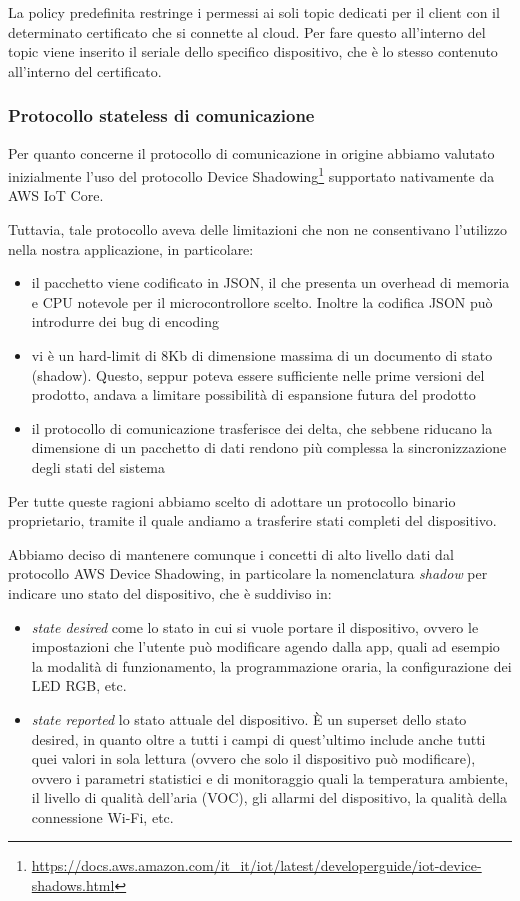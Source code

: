 \documentclass[12pt,a4paper,twoside,titlepage]{book}
\begin{document}
La policy predefinita restringe i permessi ai soli topic dedicati per il client con il determinato certificato 
che si connette al cloud. Per fare questo all'interno del topic viene inserito il seriale dello specifico 
dispositivo, che è lo stesso contenuto all'interno del certificato. 

\subsubsection{Protocollo stateless di comunicazione}

Per quanto concerne il protocollo di comunicazione in origine abbiamo valutato inizialmente 
l'uso del protocollo Device Shadowing\footnote{\url{https://docs.aws.amazon.com/it\_it/iot/latest/developerguide/iot-device-shadows.html}} 
supportato nativamente da AWS IoT Core. 

Tuttavia, tale protocollo aveva delle limitazioni che non ne consentivano l'utilizzo nella nostra
applicazione, in particolare:

\begin{itemize}
    \item il pacchetto viene codificato in JSON, il che presenta un overhead di memoria
        e CPU notevole per il microcontrollore scelto. Inoltre la codifica JSON può
        introdurre dei bug di encoding
    \item vi è un hard-limit di 8Kb di dimensione massima di un documento di stato (shadow).
        Questo, seppur poteva essere sufficiente nelle prime versioni del prodotto, andava
        a limitare possibilità di espansione futura del prodotto
    \item il protocollo di comunicazione trasferisce dei delta, che sebbene riducano la
        dimensione di un pacchetto di dati rendono più complessa la sincronizzazione degli
        stati del sistema
\end{itemize}

Per tutte queste ragioni abbiamo scelto di adottare un protocollo binario proprietario,
tramite il quale andiamo a trasferire stati completi del dispositivo.

Abbiamo deciso di mantenere comunque i concetti di alto livello dati dal protocollo AWS
Device Shadowing, in particolare la nomenclatura \textit{shadow} per indicare uno stato del 
dispositivo, che è suddiviso in:
\begin{itemize}
    \item \textit{state desired} come lo stato in cui si vuole portare il dispositivo, ovvero le
        impostazioni che l'utente può modificare agendo dalla app, quali ad esempio la modalità di funzionamento,
        la programmazione oraria, la configurazione dei LED RGB, etc.
    \item \textit{state reported} lo stato attuale del dispositivo. È un superset dello stato
        desired, in quanto oltre a tutti i campi di quest'ultimo include anche tutti quei valori
        in sola lettura (ovvero che solo il dispositivo può modificare), ovvero i parametri
        statistici e di monitoraggio quali la temperatura ambiente, il livello di qualità dell'aria (VOC),
        gli allarmi del dispositivo, la qualità della connessione Wi-Fi, etc.
\end{itemize}
\end{document}
